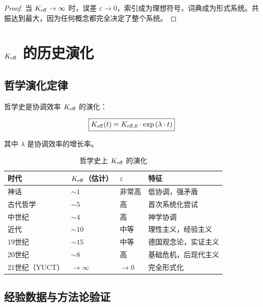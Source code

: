 \documentclass[11pt,a4paper]{article}
\newcommand{\eps}{\varepsilon}
\begin{document}
	\begin{proof}
		当 \(\Keff \to \infty\) 时，误差 \(\eps \to 0\)，索引成为理想符号，词典成为形式系统。共振达到最大，因为任何概念都完全决定了整个系统。
	\end{proof}
	
	\section{\texorpdfstring{\(\Keff\)}{K\_eff} 的历史演化}
	
	\subsection{哲学演化定律}
	
	哲学史是协调效率 \(\Keff\) 的演化：
	
	\begin{equation}
		\boxed{
			\Keff(t) = \Keff[0] \cdot \exp\left(\lambda \cdot t\right)
		}
	\end{equation}
	
	其中 \(\lambda\) 是协调效率的增长率。
	
	\begin{table}[H]
		\centering
		\caption{哲学史上 \(\Keff\) 的演化}
		\begin{tabular}{p{3cm}p{3cm}p{3cm}p{4cm}}
			\toprule
			\textbf{时代} & \(\Keff\)（估计） & \(\eps\) & \textbf{特征} \\
			\midrule
			神话 & \(\sim 1\) & 非常高 & 低协调，强矛盾 \\
			古代哲学 & \(\sim 5\) & 高 & 首次系统化尝试 \\
			中世纪 & \(\sim 4\) & 高 & 神学协调 \\
			近代 & \(\sim 10\) & 中等 & 理性主义，经验主义 \\
			19世纪 & \(\sim 15\) & 中等 & 德国观念论，实证主义 \\
			20世纪 & \(\sim 8\) & 高 & 基础危机，后现代主义 \\
			21世纪（YUCT） & \(\to \infty\) & \(\to 0\) & 完全形式化 \\
			\bottomrule
		\end{tabular}
	\end{table}
	
	\subsection{经验数据与方法论验证}
	\label{subsec:empirical-validation}
	
\end{document}
